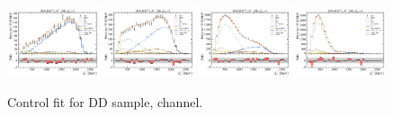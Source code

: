 \begin{figure}[!htb]
    \includegraphics[width=0.24\textwidth]{./figs-fit-fit-results/ctrl-fit/lines_q2_slices/fit_result-lines_q2_idx1-Dst-dd-el.pdf}
    \includegraphics[width=0.24\textwidth]{./figs-fit-fit-results/ctrl-fit/lines_q2_slices/fit_result-lines_q2_idx2-Dst-dd-el.pdf}
    \includegraphics[width=0.24\textwidth]{./figs-fit-fit-results/ctrl-fit/lines_q2_slices/fit_result-lines_q2_idx3-Dst-dd-el.pdf}
    \includegraphics[width=0.24\textwidth]{./figs-fit-fit-results/ctrl-fit/lines_q2_slices/fit_result-lines_q2_idx4-Dst-dd-el.pdf}

    \caption{Control fit for DD sample, \Dstar channel.}
    \label{fig:ctrl-dd-dst}
\end{figure}


